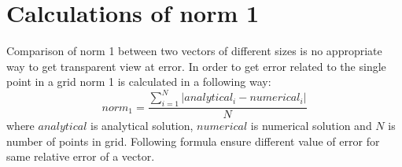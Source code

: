 \section{Calculations of norm 1} \label{app:calcNorm1}
	Comparison of norm 1 between two vectors of different sizes is no appropriate way to get transparent view at error. In order to get error related to the single point in a grid norm 1 is calculated in a following way:
	\begin{equation}
		norm_1=\frac{\sum_{i=1}^{N}|analytical_i - numerical_i|}{N}
	\end{equation}
	where $analytical$ is analytical solution, $numerical$ is numerical solution and $N$ is number of points in grid. Following formula ensure different value of error for same relative error of a vector.
\clearpage